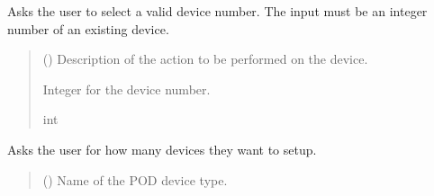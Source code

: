 \documentclass[letterpaper,10pt,english]{sphinxmanual}
\begin{document}
\begin{fulllineitems}

\begin{fulllineitems}
\label{\detokenize{Setup.SetupOneDevice:Setup.SetupOneDevice.Setup_PodInterface.SetupInterface._SelectDeviceFromDict}}
\pysigstartsignatures
{}
\pysigstopsignatures
\sphinxAtStartPar
Asks the user to select a valid device number. The input must be an integer number         of an existing device.
\begin{quote}\begin{description}
\sphinxAtStartPar
{} () \textendash{} Description of the action to be performed on the device.

\sphinxAtStartPar
Integer for the device number.

\sphinxAtStartPar
int

\end{description}\end{quote}

\end{fulllineitems}


\begin{fulllineitems}
\label{\detokenize{Setup.SetupOneDevice:Setup.SetupOneDevice.Setup_PodInterface.SetupInterface._SetNumberOfDevices}}
\pysigstartsignatures
{}
\pysigstopsignatures
\sphinxAtStartPar
Asks the user for how many devices they want to setup.
\begin{quote}\begin{description}
\sphinxAtStartPar
{} () \textendash{} Name of the POD device type.


\end{description}
\end{quote}
\end{fulllineitems}
\end{fulllineitems}
\end{document}
